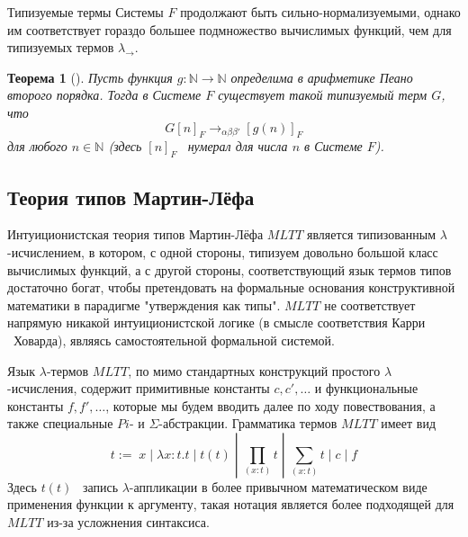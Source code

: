 \documentclass{article}[12pt]
\newtheorem{theorem}{Теорема}
\newcommand{\dash}{\textemdash\ }
\begin{document}
\begin{multicols}{2}
    \begin{prooftree}
    \end{prooftree}
    \begin{prooftree}
    \end{prooftree}
\end{multicols}
\begin{prooftree}
\end{prooftree}

Типизуемые термы Системы $F$ продолжают быть сильно-нормализуемыми\cite{SorUrz06}, однако им 
соответствует гораздо большее подмножество вычислимых функций, чем для типизуемых термов $\lambda_\rightarrow$.

\begin{theorem}[\cite{Gira71}]
    Пусть функция $g : \mathbb N \rightarrow \mathbb N$ определима в арифметике Пеано второго порядка.
    Тогда в Системе $F$ существует такой типизуемый терм $G$, что
    $$G[n]_F \rightarrow_{\alpha \beta \beta'} [g(n)]_F$$
    для любого $n \in \mathbb N$ (здесь $[n]_F$ \dash нумерал для числа $n$ в Системе $F$).
\end{theorem}

\subsection{Теория типов Мартин-Лёфа}

Интуиционистская теория типов Мартин-Лёфа $MLTT$ является типизованным $\lambda$-исчислением, в котором,
с одной стороны, типизуем довольно большой класс вычислимых функций, а с другой стороны, соответствующий
язык термов типов достаточно богат, чтобы претендовать на формальные основания конструктивной
математики в парадигме "утверждения как типы". $MLTT$ не соответствует напрямую никакой интуиционистской логике
(в смысле соответствия Карри \dash Ховарда), являясь самостоятельной формальной системой.

Язык $\lambda$-термов $MLTT$, по мимо стандартных конструкций простого $\lambda$-исчисления, содержит
примитивные константы $c, c', \dots$ и функциональные константы $f, f', \dots$, которые мы будем вводить
далее по ходу повествования, а также специальные $Pi$- и $\Sigma$-абстракции. Грамматика термов $MLTT$ имеет вид
$$t := \; x \; | \; \lambda x : t . t \; | \; t(t) \; | \; \prod_{(x : t)} t \; | \; \sum_{(x : t)} t \; | \; c \; | \; f$$
Здесь $t(t)$ \dash запись $\lambda$-аппликации в более привычном математическом виде применения функции к аргументу,
такая нотация является более подходящей для $MLTT$ из-за усложнения синтаксиса.
\end{document}
